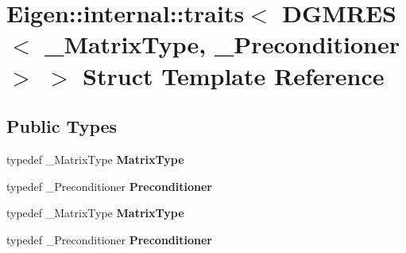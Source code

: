 \hypertarget{struct_eigen_1_1internal_1_1traits_3_01_d_g_m_r_e_s_3_01___matrix_type_00_01___preconditioner_01_4_01_4}{}\section{Eigen\+:\+:internal\+:\+:traits$<$ D\+G\+M\+R\+ES$<$ \+\_\+\+Matrix\+Type, \+\_\+\+Preconditioner $>$ $>$ Struct Template Reference}
\label{struct_eigen_1_1internal_1_1traits_3_01_d_g_m_r_e_s_3_01___matrix_type_00_01___preconditioner_01_4_01_4}
\subsection*{Public Types}
\begin{DoxyCompactItemize}
\item 
\mbox{\label{struct_eigen_1_1internal_1_1traits_3_01_d_g_m_r_e_s_3_01___matrix_type_00_01___preconditioner_01_4_01_4_ac484f53f4a4d6333189bc3eea934fe70}} 
typedef \+\_\+\+Matrix\+Type {\bfseries Matrix\+Type}
\item 
\mbox{\label{struct_eigen_1_1internal_1_1traits_3_01_d_g_m_r_e_s_3_01___matrix_type_00_01___preconditioner_01_4_01_4_a9202fcd39a676b35549434edb6680877}} 
typedef \+\_\+\+Preconditioner {\bfseries Preconditioner}
\item 
\mbox{\label{struct_eigen_1_1internal_1_1traits_3_01_d_g_m_r_e_s_3_01___matrix_type_00_01___preconditioner_01_4_01_4_ac484f53f4a4d6333189bc3eea934fe70}} 
typedef \+\_\+\+Matrix\+Type {\bfseries Matrix\+Type}
\item 
\mbox{\label{struct_eigen_1_1internal_1_1traits_3_01_d_g_m_r_e_s_3_01___matrix_type_00_01___preconditioner_01_4_01_4_a9202fcd39a676b35549434edb6680877}} 
typedef \+\_\+\+Preconditioner {\bfseries Preconditioner}
\end{DoxyCompactItemize}



